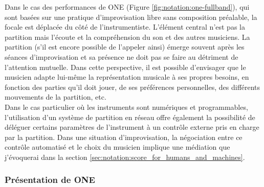 \noindent Dans le cas des performances de ONE (Figure \ref{fig:notation:one-fullband}), qui sont basées sur une pratique d'improvisation libre sans composition préalable, la focale est déplacée du côté de l'instrumentiste. L'élément central n'est pas la partition mais l'écoute et la compréhension du son et des autres musiciens. La partition (s'il est encore possible de l'appeler ainsi) émerge souvent après les séances d'improvisation et sa présence ne doit pas se faire au détriment de l'attention mutuelle. Dans cette perspective, il est possible d'envisager que le musicien adapte lui-même la représentation musicale à ses propres besoins, en fonction des parties qu'il doit jouer, de ses préférences personnelles, des différents mouvements de la partition, etc.\\
\indent Dans le cas particulier où les instruments sont numériques et programmables, l'utilisation d'un système de partition en réseau offre également la possibilité de déléguer certains paramètres de l'instrument à un contrôle externe pris en charge par la partition. Dans une situation d'improvisation, la négociation entre ce contrôle automatisé et le choix du musicien implique une médiation que j'évoquerai dans la section \ref{sec:notation:score_for_humans_and_machines}.

\subsubsection{Présentation de ONE}

